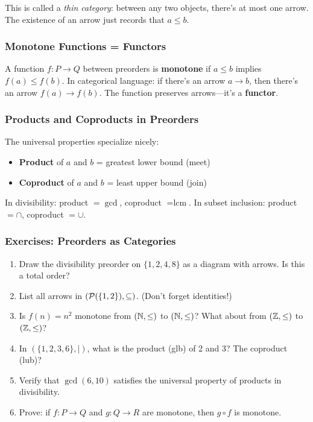 \begin{goingdeeper}
This is called a \emph{thin category}: between any two objects, there's at most one arrow. The existence of an arrow just records that $a \leq b$.

\subsubsection*{Monotone Functions = Functors}

A function $f: P \to Q$ between preorders is \textbf{monotone} if $a \leq b$ implies $f(a) \leq f(b)$. In categorical language: if there's an arrow $a \to b$, then there's an arrow $f(a) \to f(b)$. The function preserves arrows---it's a \textbf{functor}.

\subsubsection*{Products and Coproducts in Preorders}

The universal properties specialize nicely:
\begin{itemize}
  \item \textbf{Product} of $a$ and $b$ = greatest lower bound (meet)
  \item \textbf{Coproduct} of $a$ and $b$ = least upper bound (join)
\end{itemize}

In divisibility: product $= \gcd$, coproduct $= \text{lcm}$.
In subset inclusion: product $= \cap$, coproduct $= \cup$.

\subsubsection*{Exercises: Preorders as Categories}

\begin{enumerate}
  \item Draw the divisibility preorder on $\{1, 2, 4, 8\}$ as a diagram with arrows. Is this a total order?

  \item List all arrows in $(\mathcal{P}(\{1, 2\}), \subseteq)$. (Don't forget identities!)

  \item Is $f(n) = n^2$ monotone from $(\mathbb{N}, \leq)$ to $(\mathbb{N}, \leq)$? What about from $(\mathbb{Z}, \leq)$ to $(\mathbb{Z}, \leq)$?

  \item In $(\{1, 2, 3, 6\}, \mid)$, what is the product (glb) of 2 and 3? The coproduct (lub)?

  \item Verify that $\gcd(6, 10)$ satisfies the universal property of products in divisibility.

  \item Prove: if $f: P \to Q$ and $g: Q \to R$ are monotone, then $g \circ f$ is monotone.
\end{enumerate}
\end{goingdeeper}

